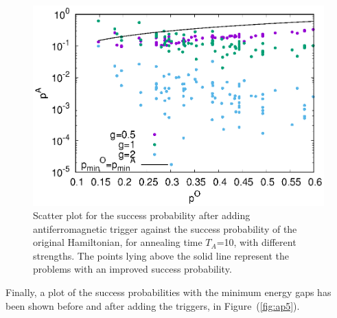 \documentclass[../main.tex]{subfiles}
\begin{document}
\begin{appendices}
\begin{figure}[H]
\centering 
\includegraphics[scale=0.8]{Succ_OA_8.eps}
\caption{Scatter plot for the success probability after adding antiferromagnetic trigger against the success probability of the original Hamiltonian, for annealing time $T_A$=10, with different strengths. The points lying above the solid line represent the problems with an improved success probability.}
\label{fig:ap4}
\end{figure}

Finally, a plot of the success probabilities with the minimum energy gaps has been shown before and after adding the triggers, in Figure~(\ref{fig:ap5}).



\end{appendices}
\end{document}
